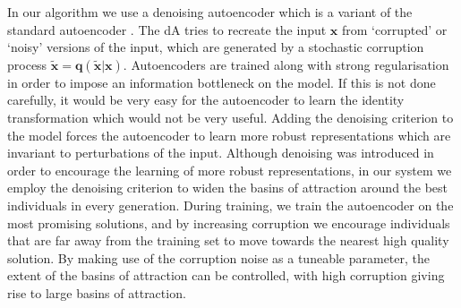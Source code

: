 \documentclass[runningheads,a4paper]{llncs}
\begin{document}
In our algorithm we use a denoising autoencoder which is a variant of the standard autoencoder \cite{vincent2008extracting}. The dA tries to recreate the input $\mathbf x$ from `corrupted' or `noisy' versions of the input, which are generated by a stochastic corruption process $\mathbf{\tilde x = q(\tilde x|x)}$. Autoencoders are trained along with strong regularisation in order to impose an information bottleneck on the model. If this is not done carefully, it would be very easy for the autoencoder to learn the identity transformation which would not be very useful. Adding the denoising criterion to the model forces the autoencoder to learn more robust representations which are invariant to perturbations of the input. Although denoising was introduced in order to encourage the learning of more robust representations, in our system we employ the denoising criterion to widen the basins of attraction around the best individuals in every generation. During training, we train the autoencoder on the most promising solutions, and by increasing corruption we encourage individuals that are far away from the training set to move towards the nearest high quality solution. By making use of the corruption noise as a tuneable parameter, the extent of the basins of attraction can be controlled, with high corruption giving rise to large basins of attraction.




 

\end{document}
